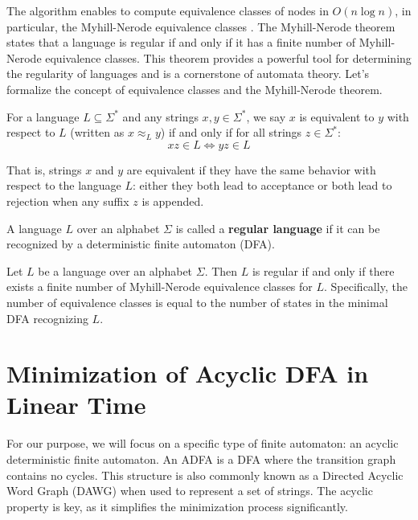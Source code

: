 The algorithm enables to compute equivalence classes of nodes in $O(n\log n)$, in particular, the Myhill-Nerode equivalence classes \cite{nerode1958linear, myhill1957finite}. The Myhill-Nerode theorem states that a language is regular if and only if it has a finite number of Myhill-Nerode equivalence classes. This theorem provides a powerful tool for determining the regularity of languages and is a cornerstone of automata theory. Let's formalize the concept of equivalence classes and the Myhill-Nerode theorem.

\begin{definition}
    For a language $L \subseteq \Sigma^*$ and any strings $x,y \in \Sigma^*$, we say $x$ is equivalent to $y$ with respect to $L$ (written as $x \approx_L y$) if and only if for all strings $z \in \Sigma^*$:
    \[ xz \in L \Leftrightarrow yz \in L \]
\end{definition}
That is, strings $x$ and $y$ are equivalent if they have the same behavior with respect to the language $L$: either they both lead to acceptance or both lead to rejection when any suffix $z$ is appended.

\begin{definition}
    A language $L$ over an alphabet $\Sigma$ is called a \textbf{regular language} if it can be recognized by a deterministic finite automaton (DFA).
\end{definition}

\begin{theorem} \label{def:myhill-nerode}
    Let $L$ be a language over an alphabet $\Sigma$. Then $L$ is regular if and only if there exists a finite number of Myhill-Nerode equivalence classes for $L$. Specifically, the number of equivalence classes is equal to the number of states in the minimal DFA recognizing $L$.
\end{theorem}

\section{Minimization of Acyclic DFA in Linear Time}
For our purpose, we will focus on a specific type of finite automaton: an acyclic deterministic finite automaton. An ADFA is a DFA where the transition graph contains no cycles. This structure is also commonly known as a Directed Acyclic Word Graph (DAWG) when used to represent a set of strings. The acyclic property is key, as it simplifies the minimization process significantly. 

